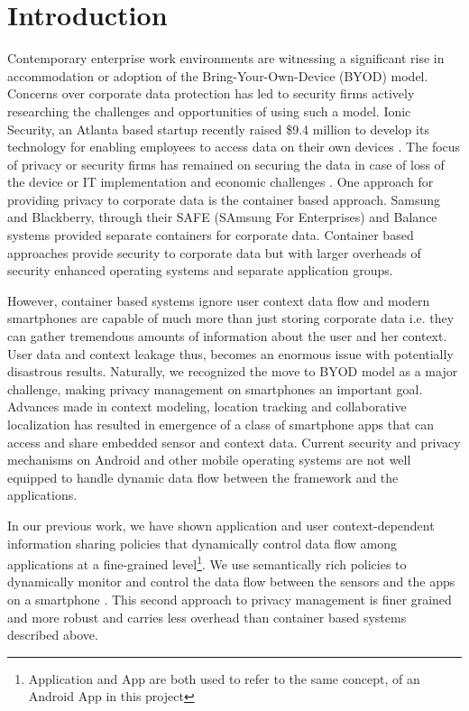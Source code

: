 \documentclass{ubicomp2013}
\begin{document}
\section{Introduction}

Contemporary enterprise work environments are witnessing a significant rise in accommodation or adoption of the Bring-Your-Own-Device (BYOD) model. Concerns over corporate data protection has led to security firms actively researching the challenges and opportunities of using such a model. Ionic Security, an Atlanta based startup recently raised \$9.4 million to develop its technology for enabling employees to access data on their own devices \cite{harris2013byod}. The focus of privacy or security firms has remained on securing the data in case of loss of the device \cite{goldberg2013byod} or IT implementation and economic challenges \cite{guptill2013byod}. One approach for providing privacy to corporate data is the container based approach. Samsung and Blackberry, through their SAFE (SAmsung For Enterprises) \cite{honig2013knox} and Balance \cite{halliwell2013balance} systems 
provided separate containers for corporate data. Container based approaches provide security to corporate data but with larger overheads of security enhanced operating systems and separate application groups.

However, container based systems ignore user context data flow and modern smartphones are capable of much more than just storing corporate data i.e. they can gather tremendous amounts of information about the user and her context. User data and context leakage thus, becomes an enormous issue with potentially disastrous results. Naturally, we recognized the move to BYOD model as a major challenge, making privacy management on smartphones an important goal. Advances made in context modeling, location tracking and collaborative localization has resulted in emergence of a class of smartphone apps that can access and share embedded sensor and context data. Current security and privacy mechanisms on Android and other mobile operating systems are not well equipped to handle dynamic data flow between the framework and the applications.

In our previous work, we have shown application and user context-dependent information sharing policies that dynamically control data flow among applications at a fine-grained level\footnote{Application and App are both used to refer to the same concept, of an Android App in this project}. We use semantically rich policies to dynamically monitor and control the data flow between the sensors and the apps on a smartphone \cite{ghosh2012ms}. This second approach to privacy management is finer grained and more robust and carries less overhead than container based systems described above.
\end{document}
